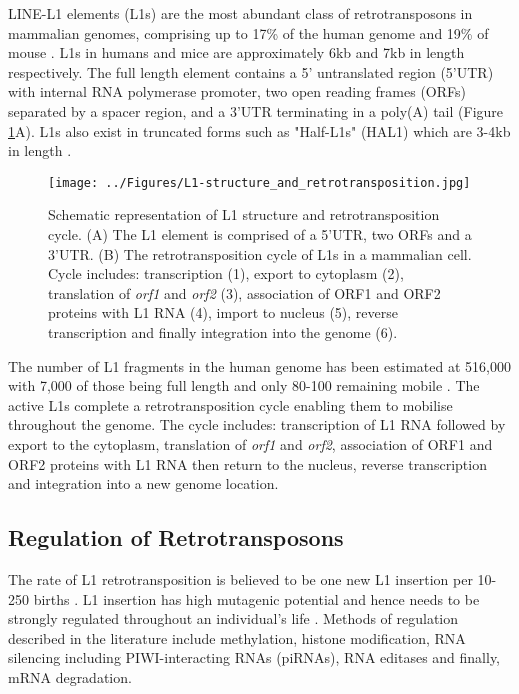 \documentclass[12pt]{article}
\begin{document}
			LINE-L1 elements (L1s) are the most abundant class of retrotransposons in mammalian genomes, comprising up to 17\%  of the human genome and 19\% of mouse \citep{Belancio08,Bodak14,Graham06}.
			L1s in humans and mice are approximately 6kb and 7kb in length respectively.
			The full length element contains a 5' untranslated region (5'UTR) with internal RNA polymerase promoter, two open reading frames (ORFs) separated by a spacer region, and a 3'UTR terminating in a poly(A) tail (Figure \ref{L1-structure-RT}A)\citep{Belancio07,Bodak14}. L1s also exist in truncated forms such as "Half-L1s" (HAL1) which are 3-4kb in length \citep{Bao10}.
			
				\begin{figure}[tb] %
					\centering
					\texttt{[image: ../Figures/L1-structure\_and\_retrotransposition.jpg]}
					\caption{Schematic representation of L1 structure and retrotransposition cycle.
					(A) The L1 element is comprised of a 5'UTR, two ORFs and a 3'UTR.
					(B) The retrotransposition cycle of L1s in a mammalian cell.
					Cycle includes: transcription (1), export to cytoplasm (2), translation of \textit{orf1} and \textit{orf2} (3), association of ORF1 and ORF2 proteins with L1 RNA (4), import to nucleus (5), reverse transcription and finally integration into the genome (6). \citep[adapted from:][]{Bodak14}}
					\label{L1-structure-RT}
				\end{figure}

			The number of L1 fragments in the human genome has been estimated at 516,000 \citep{Lander01} with 7,000 of those being full length \citep{Khan03} and only 80-100 remaining mobile \citep{Brouha03}.
			The active L1s complete a retrotransposition cycle enabling them to mobilise throughout the genome.
			The cycle includes: transcription of L1 RNA followed by export to the cytoplasm, translation of \textit{orf1} and \textit{orf2}, association of ORF1 and ORF2 proteins with L1 RNA then return to the nucleus, reverse transcription and integration into a new genome location. 
			


		\subsection{Regulation of Retrotransposons}
		
			The rate of L1 retrotransposition is believed to be one new L1 insertion per 10-250 births \citep{Bodak14}. 
			L1 insertion has high mutagenic potential and hence needs to be strongly regulated throughout an individual's life \citep{Garcia-Perez10, Castaneda11}.
			Methods of regulation described in the literature include methylation, histone modification, RNA silencing including PIWI-interacting RNAs (piRNAs), RNA editases and finally, mRNA degradation. 
			
\end{document}
